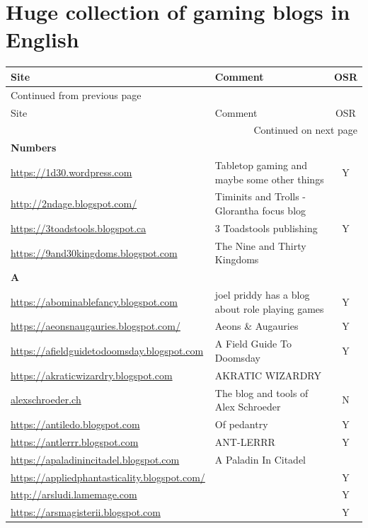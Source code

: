 \documentclass[a4paper, 11pt, twoside]{article}
\begin{document}
\section{Huge collection of gaming blogs in English}
\label{sec:orge243743}

\begin{longtable}{p{6cm}p{8cm}c}
Site & Comment & OSR\\
\hline
\endfirsthead
\multicolumn{3}{l}{Continued from previous page} \\
\hline

Site & Comment & OSR \\

\hline
\endhead
\hline\multicolumn{3}{r}{Continued on next page} \\
\endfoot
\endlastfoot
\hline
\textbf{Numbers} &  & \\
\url{https://1d30.wordpress.com} & Tabletop gaming and maybe some other things & Y\\
\url{http://2ndage.blogspot.com/} & Timinits and Trolls - Glorantha focus blog & \\
\url{https://3toadstools.blogspot.ca} & 3 Toadstools publishing & Y\\
\url{https://9and30kingdoms.blogspot.com} & The Nine and Thirty Kingdoms & \\
\textbf{A} &  & \\
\url{https://abominablefancy.blogspot.com} & joel priddy has a blog about role playing games & Y\\
\url{https://aeonsnaugauries.blogspot.com/} & Aeons \& Augauries & Y\\
\url{https://afieldguidetodoomsday.blogspot.com} & A Field Guide To Doomsday & Y\\
\url{https://akraticwizardry.blogspot.com} & AKRATIC WIZARDRY & \\
\href{https://alexschroeder.ch/wiki/RPG}{alexschroeder.ch} & The blog and tools of Alex Schroeder & N\\
\url{https://antiledo.blogspot.com} & Of pedantry & Y\\
\url{https://antlerrr.blogspot.com} & ANT-LERRR & Y\\
\url{https://apaladinincitadel.blogspot.com} & A Paladin In Citadel & \\
\url{https://appliedphantasticality.blogspot.com/} &  & Y\\
\url{http://arsludi.lamemage.com} &  & Y\\
\url{https://arsmagisterii.blogspot.com} &  & Y\\

\end{longtable}
\end{document}
